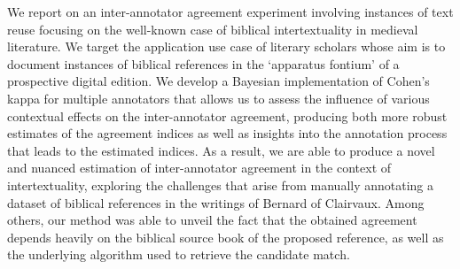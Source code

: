 We report on an inter-annotator agreement experiment involving instances of text reuse focusing on the well-known case of biblical intertextuality in medieval literature. We target the application use case of literary scholars whose aim is to document instances of biblical references in the `apparatus fontium' of a prospective digital edition. We develop a Bayesian implementation of Cohen's kappa for multiple annotators that allows us to assess the influence of various contextual effects on the inter-annotator agreement, producing both more robust estimates of the agreement indices as well as insights into the annotation process that leads to the estimated indices. As a result, we are able to produce a novel and nuanced estimation of inter-annotator agreement in the context of intertextuality, exploring the challenges that arise from manually annotating a dataset of biblical references in the writings of Bernard of Clairvaux. Among others, our method was able to unveil the fact that the obtained agreement depends heavily on the biblical source book of the proposed reference, as well as the underlying algorithm used to retrieve the candidate match.
